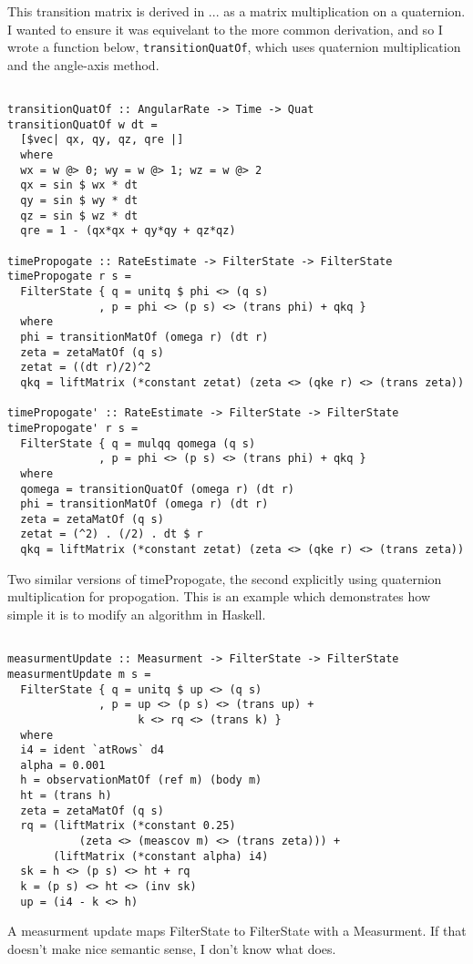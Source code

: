 \documentclass[12pt]{report}
\begin{document}
This transition matrix is derived in ... as a matrix multiplication on a quaternion. I wanted to ensure it was equivelant to the more common derivation, and so I wrote a function below, \lstinline$transitionQuatOf$, which uses quaternion multiplication and the angle-axis method.

\begin{lstlisting}

transitionQuatOf :: AngularRate -> Time -> Quat
transitionQuatOf w dt = 
  [$vec| qx, qy, qz, qre |]
  where
  wx = w @> 0; wy = w @> 1; wz = w @> 2
  qx = sin $ wx * dt
  qy = sin $ wy * dt
  qz = sin $ wz * dt
  qre = 1 - (qx*qx + qy*qy + qz*qz)

timePropogate :: RateEstimate -> FilterState -> FilterState
timePropogate r s = 
  FilterState { q = unitq $ phi <> (q s)
              , p = phi <> (p s) <> (trans phi) + qkq }
  where 
  phi = transitionMatOf (omega r) (dt r)
  zeta = zetaMatOf (q s)
  zetat = ((dt r)/2)^2
  qkq = liftMatrix (*constant zetat) (zeta <> (qke r) <> (trans zeta))

timePropogate' :: RateEstimate -> FilterState -> FilterState
timePropogate' r s = 
  FilterState { q = mulqq qomega (q s)
              , p = phi <> (p s) <> (trans phi) + qkq }
  where 
  qomega = transitionQuatOf (omega r) (dt r)
  phi = transitionMatOf (omega r) (dt r)
  zeta = zetaMatOf (q s)
  zetat = (^2) . (/2) . dt $ r
  qkq = liftMatrix (*constant zetat) (zeta <> (qke r) <> (trans zeta))  

\end{lstlisting}
Two similar versions of timePropogate, the second explicitly using quaternion multiplication for propogation. This is an example which demonstrates how simple it is to modify an algorithm in Haskell.

\begin{lstlisting}

measurmentUpdate :: Measurment -> FilterState -> FilterState
measurmentUpdate m s = 
  FilterState { q = unitq $ up <> (q s)
              , p = up <> (p s) <> (trans up) +
                    k <> rq <> (trans k) }
  where 
  i4 = ident `atRows` d4
  alpha = 0.001
  h = observationMatOf (ref m) (body m)
  ht = (trans h)
  zeta = zetaMatOf (q s)
  rq = (liftMatrix (*constant 0.25) 
           (zeta <> (meascov m) <> (trans zeta))) + 
       (liftMatrix (*constant alpha) i4)
  sk = h <> (p s) <> ht + rq 
  k = (p s) <> ht <> (inv sk)  
  up = (i4 - k <> h)

\end{lstlisting}
A measurment update maps FilterState to FilterState with a Measurment. If that doesn't make nice semantic sense, I don't know what does. 
\end{document}

